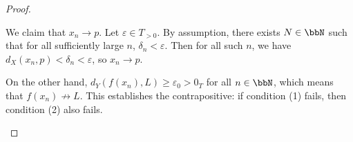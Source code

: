 \begin{proof}
\begin{enumerate}
        We claim that $x_n \to p$. Let $\varepsilon \in T_{>0}$. By assumption, there exists $N \in \bbN$ such that for all sufficiently large $n$, $\delta_n < \varepsilon$. Then for all such $n$, we have $d_X(x_n, p) < \delta_n < \varepsilon$, so $x_n \to p$.

        On the other hand, $d_Y(f(x_n), L) \geq \varepsilon_0 > 0_T$ for all $n \in \bbN$, which means that $f(x_n) \not\to L$. This establishes the contrapositive: if condition (1) fails, then condition (2) also fails.
    \end{enumerate}
\end{proof}